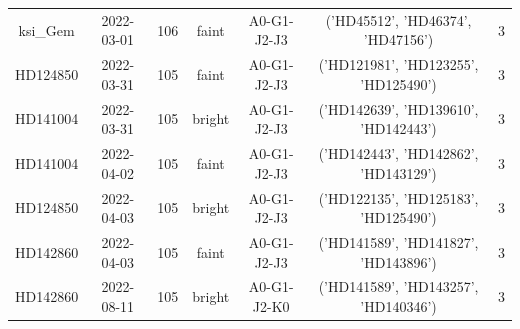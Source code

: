 \begin{tabular}{ccccccc}
ksi_Gem & 2022-03-01 & 106 & faint & A0-G1-J2-J3 & ('HD45512', 'HD46374', 'HD47156') & 3 \\
HD124850 & 2022-03-31 & 105 & faint & A0-G1-J2-J3 & ('HD121981', 'HD123255', 'HD125490') & 3 \\
HD141004 & 2022-03-31 & 105 & bright & A0-G1-J2-J3 & ('HD142639', 'HD139610', 'HD142443') & 3 \\
HD141004 & 2022-04-02 & 105 & faint & A0-G1-J2-J3 & ('HD142443', 'HD142862', 'HD143129') & 3 \\
HD124850 & 2022-04-03 & 105 & bright & A0-G1-J2-J3 & ('HD122135', 'HD125183', 'HD125490') & 3 \\
HD142860 & 2022-04-03 & 105 & faint & A0-G1-J2-J3 & ('HD141589', 'HD141827', 'HD143896') & 3 \\
HD142860 & 2022-08-11 & 105 & bright & A0-G1-J2-K0 & ('HD141589', 'HD143257', 'HD140346') & 3 \\
\hline
\end{tabular}
